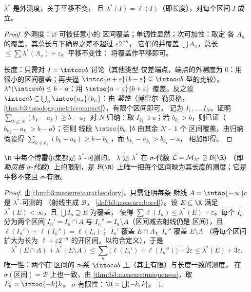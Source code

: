 \begin{lemma}\label{lem:b3:measure:outerbasics}
$\lambda^*$ 是外测度，关于平移不变，
且 $\lambda^*(I) = \ell(I)$（即长度），对每个区间
$I$ 成立。
\end{lemma}

\begin{proof}
外测度：$\varnothing$ 可被任意小的
区间覆盖；单调性显然；次可加性：取定
各 $A_n$ 的覆盖，其总长与下确界之差不超过 $\varepsilon 2^{-n}$，
它们的并覆盖 $\bigcup A_n$，总长 $\leq \sum
\lambda^*(A_n) + \varepsilon$。平移不变性：
将覆盖作平移即可。

长度：只需对 $I = \intcc ab$ 讨论（其他类型
仅差端点，端点的外测度为 $0$：用
很小的区间覆盖；再夹逼 $\intcc{a+\varepsilon}{b -
\varepsilon} \subseteq \intoo ab$ 型的比较）。
$\lambda^*(\intcc ab) \leq b - a$：用
$\intoo{a-\varepsilon}{b+\varepsilon}$ 覆盖。反之设 $\intcc
ab \subseteq \bigcup_n\intoo{a_n}{b_n}$：由
\emph{紧性}（博雷尔–勒贝格，
\cref{thm:b3:topology:metriccompact}），有限个区间即可，
记为 $I_1, \dots, I_N$。证明 $\sum_{k\leq N}(b_k -
a_k) \geq b - a$，对 $N$ 归纳：取 $I_{k_1} \ni a$；若
$b_{k_1} > b$，则已证（$b_{k_1} - a_{k_1} > b - a$）；否则
线段 $\intcc{b_{k_1}}b$ 由其余 $N - 1$ 个
区间覆盖，由归纳假设得 $\sum_{k \neq k_1}(b_k - a_k)
\geq b - b_{k_1}$，而 $b_{k_1} - a_{k_1} > b_{k_1} - a$，
相加即得。
\end{proof}

\begin{theorem}[勒贝格测度]\label{thm:b3:measure:lebesgue}
$\R$ 中每个博雷尔集都是 $\lambda^*$-可测的。
$\lambda$ 是 $\lambda^*$ 在
$\sigma$-代数 $\mathcal L = \mathcal M_{\lambda^*} \supseteq \mathcal B(\R)$
（即\emph{勒贝格 $\sigma$-代数}）上的限制，是
$\mathcal B(\R)$ 上唯一把每个区间映为其长度的测度；它是
平移不变且 $\sigma$-有限。
\end{theorem}

\begin{proof}
由\cref{thm:b3:measure:caratheodory}，只需证明每条
射线 $A = \intoo{-\infty}c$ 是 $\lambda^*$-可测的
（射线生成 $\mathcal B$，
\cref{def:b3:measure:borel}）。设 $E \subseteq \R$ 满足
$\lambda^*(E) < \infty$，且 $\bigcup I_n \supseteq E$ 为覆盖，
使得 $\sum\ell(I_n) \leq \lambda^*(E) + \varepsilon$。每个
$I_n$ 分为两个区间 $I_n' = I_n \cap A$ 与
$I_n'' = I_n\setminus A$（区间减去射线仍是
区间），且 $\ell(I_n') + \ell(I_n'') = \ell(I_n)$；
$I_n'$ 覆盖 $E \cap A$，$I_n''$ 覆盖 $E \setminus A$
（将每个区间扩大为长为 $\ell +
\varepsilon2^{-n}$ 的开区间，以符合定义），于是
\[
\lambda^*(E\cap A) + \lambda^*(E\setminus A)
\leq \sum_n\bigl(\ell(I_n') + \ell(I_n'')\bigr) + 2\varepsilon
\leq \lambda^*(E) + 3\varepsilon .
\]
唯一性：两个在
区间的 $\pi$-系 $\intoc ab$ 上（其上有限）与长度一致的测度，
在 $\sigma(\text{区间}) = \mathcal B$ 上也一致，由
\cref{thm:b3:measure:uniqueness}，取 $P_k = \intoc{-k}k$。
$\sigma$-有限性：$\R = \bigcup(-k, k]$。
\end{proof}

